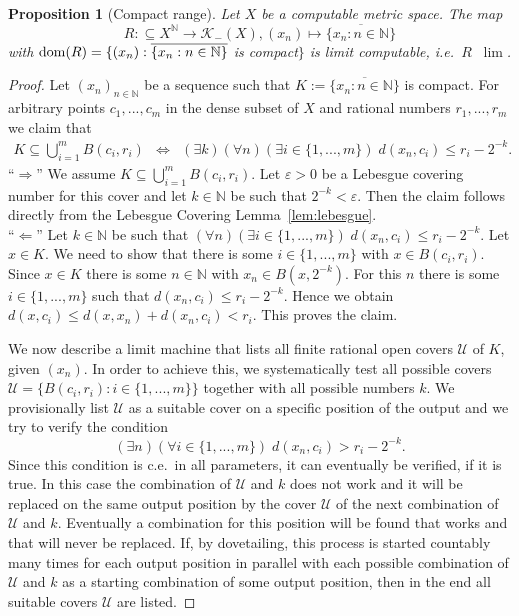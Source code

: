 \documentclass[a4paper]{amsart}
\def\KK{{\mathcal K}}
\def\UU{{\mathcal U}}
\def\IN{{\mathbb{N}}}
\def\TO{\Longrightarrow}
\def\In{\subseteq}
\def\dom{{\rm dom}}
\def\leqSW{\mathop{\leq_{\mathrm{sW}}}}
\newtheorem{proposition}[theorem]{Proposition}
\theoremstyle{definition}
\begin{document}
\begin{proposition}[Compact range]
\label{prop:compact-range}
Let $X$ be a computable metric space. The map
\[R:\In X^\IN\to\KK_-(X),(x_n)\mapsto\overline{\{x_n:n\in\IN\}}\]
with $\dom(R)=\{(x_n):\overline{\{x_n:n\in\IN\}}$ is compact$\}$
is limit computable, i.e.\ $R\leqSW\lim$.
\end{proposition}
\begin{proof}
Let $(x_n)_{n\in\IN}$ be a sequence such that $K:=\overline{\{x_n:n\in\IN\}}$ is compact. 
For arbitrary points $c_1,...,c_m$ in the dense subset of $X$ and rational numbers $r_1,...,r_m$
we claim that
\begin{eqnarray*}
K\In\bigcup_{i=1}^mB(c_i,r_i)
&\iff& (\exists k)(\forall n)(\exists i\in\{1,...,m\})\;d(x_n,c_i)\leq r_i-2^{-k}.
\end{eqnarray*}
``$\TO$'' We assume $K\In\bigcup_{i=1}^mB(c_i,r_i)$. Let $\varepsilon>0$ be a Lebesgue covering number
for this cover and let $k\in\IN$ be such that $2^{-k}<\varepsilon$. Then the claim follows directly
from the Lebesgue Covering Lemma~\ref{lem:lebesgue}.\\
``$\Longleftarrow$'' Let $k\in\IN$ be such that $(\forall n)(\exists i\in\{1,...,m\})\;d(x_n,c_i)\leq r_i-2^{-k}$.
Let $x\in K$. We need to show that there is some $i\in\{1,...,m\}$ with $x\in B(c_i,r_i)$.
Since $x\in K$ there is some $n\in\IN$ with $x_n\in B(x,2^{-k})$.
For this $n$ there is some $i\in\{1,...,m\}$ such that $d(x_n,c_i)\leq r_i-2^{-k}$. Hence we obtain
$d(x,c_i)\leq d(x,x_n)+d(x_n,c_i)<r_i$. This proves the claim.

We now describe a limit machine that lists all finite rational open covers $\UU$ of $K$, given $(x_n)$. 
In order to achieve this, we systematically test all possible covers $\UU=\{B(c_i,r_i):i\in\{1,...,m\}\}$ together with all possible numbers $k$. 
We provisionally list $\UU$ as a suitable cover on a specific position of the output and we try to verify the condition
\[(\exists n)(\forall i\in\{1,...,m\})\;d(x_n,c_i)>r_i-2^{-k}.\]
Since this condition is c.e.\ in all parameters, it can eventually be verified, if it is true.
In this case the combination of $\UU$ and $k$ does not work and it will be replaced on the same output position
by the cover $\UU$ of the next combination of $\UU$ and $k$.
Eventually a combination for this position will be found that works and that will never be replaced.
If, by dovetailing,  this process is started countably many times for each output position in parallel with each possible combination 
of $\UU$ and $k$ as a starting combination of some output position,  then in the end all suitable covers $\UU$ are listed.
\end{proof}
\end{document}
